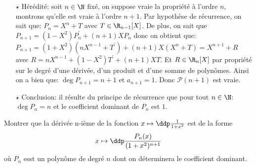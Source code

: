 \documentclass[a4paper, 11pt,reqno]{article}
\begin{document}
\begin{correction}
\begin{enumerate}
\begin{itemize}
\begin{itemize}
				            \item[$\star$] H\'er\'edit\'e: soit $n\in\N$ fix\'e, on suppose vraie la propri\'et\'e \`{a} l'ordre $n$, montrons qu'elle est vraie \`{a} l'ordre $n+1$. Par hypoth\`{e}se de r\'ecurrence, on sait que: $P_n=X^n+T$ avec $T\in\R_{n-1}\lbrack X\rbrack$. De plus, on sait que $P_{n+1}=(1-X^2)P_n^{\prime}+(n+1)XP_n$ donc on obtient que: $P_{n+1}=(1+X^2)(nX^{n-1}+T^{\prime})+(n+1)X ( X^{n}+T)=X^{n+1}+R$ avec $R=n X^{n-1}+(1-X^2)T^{\prime}+(n+1)XT$. Et $R\in \R_{n}\lbrack X\rbrack$ par propri\'et\'e sur le degr\'e d'une d\'eriv\'ee, d'un produit et d'une somme de polyn\^{o}mes. Ainsi on a bien que: $\deg{P_{n+1}}=n+1$ et $a_{n+1}=1$. Donc $\mathcal{P}(n+1)$ est vraie.
				            \item[$\star$] Conclusion: il r\'esulte du principe de r\'ecurrence que pour tout $n\in\N$: $\deg{P_n}=n$ et le coefficient dominant de $P_n$ est $1$.
			            \end{itemize}
		      \end{itemize}
	\end{enumerate}
\end{correction}


\begin{exercice}
	Montrer que la d\'eriv\'ee n-i\`eme de la fonction $x\mapsto \ddp\frac{1}{1+x^2}$ est de la forme
	$$x\mapsto \ddp\frac{P_n(x)}{(1+x^2)^{n+1}}$$
	o\`u $P_n$ esst un polyn\^ome de degr\'e $n$ dont on d\'eterminera le coefficient dominant.
\end{exercice}
\end{document}
